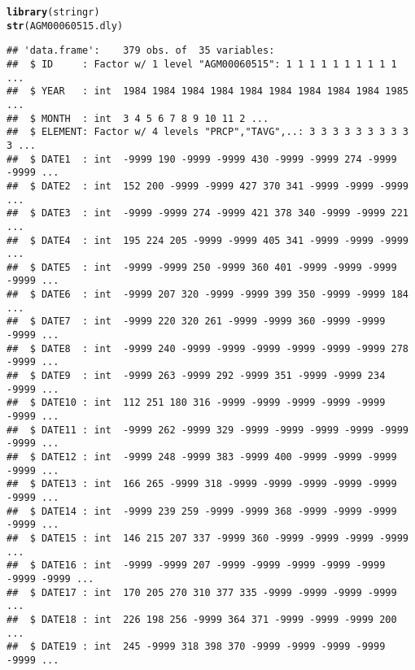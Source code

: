 \documentclass{article}\usepackage[]{graphicx}\usepackage[]{color}
\makeatletter
\newcommand{\hlstd}[1]{\textcolor[rgb]{0.345,0.345,0.345}{#1}}%
\newcommand{\hlkwd}[1]{\textcolor[rgb]{0.737,0.353,0.396}{\textbf{#1}}}%
\newenvironment{kframe}{%
 \def\at@end@of@kframe{}%
 \ifinner\ifhmode%
  \def\at@end@of@kframe{\end{minipage}}%
  \begin{minipage}{\columnwidth}%
 \fi\fi%
 \def\FrameCommand##1{\hskip\@totalleftmargin \hskip-\fboxsep
 \colorbox{shadecolor}{##1}\hskip-\fboxsep
     \hskip-\linewidth \hskip-\@totalleftmargin \hskip\columnwidth}%
 \MakeFramed {\advance\hsize-\width
   \@totalleftmargin\z@ \linewidth\hsize
   \@setminipage}}%
 {\par\unskip\endMakeFramed%
 \at@end@of@kframe}
\newenvironment{knitrout}{}{} %
\makeatother
\begin{document}
\begin{knitrout}
\begin{kframe}
{\ttfamily\noindent\itshape\color{messagecolor}{\#\# \\\#\# Attaching package: 'dplyr'\\\#\# \\\#\# The following objects are masked from 'package:stats':\\\#\# \\\#\#\ \ \ \  filter, lag\\\#\# \\\#\# The following objects are masked from 'package:base':\\\#\# \\\#\#\ \ \ \  intersect, setdiff, setequal, union}}\begin{alltt}
\hlkwd{library}\hlstd{(stringr)}
\hlkwd{str}\hlstd{(AGM00060515.dly)}
\end{alltt}
\begin{verbatim}
## 'data.frame':	379 obs. of  35 variables:
##  $ ID     : Factor w/ 1 level "AGM00060515": 1 1 1 1 1 1 1 1 1 1 ...
##  $ YEAR   : int  1984 1984 1984 1984 1984 1984 1984 1984 1984 1985 ...
##  $ MONTH  : int  3 4 5 6 7 8 9 10 11 2 ...
##  $ ELEMENT: Factor w/ 4 levels "PRCP","TAVG",..: 3 3 3 3 3 3 3 3 3 3 ...
##  $ DATE1  : int  -9999 190 -9999 -9999 430 -9999 -9999 274 -9999 -9999 ...
##  $ DATE2  : int  152 200 -9999 -9999 427 370 341 -9999 -9999 -9999 ...
##  $ DATE3  : int  -9999 -9999 274 -9999 421 378 340 -9999 -9999 221 ...
##  $ DATE4  : int  195 224 205 -9999 -9999 405 341 -9999 -9999 -9999 ...
##  $ DATE5  : int  -9999 -9999 250 -9999 360 401 -9999 -9999 -9999 -9999 ...
##  $ DATE6  : int  -9999 207 320 -9999 -9999 399 350 -9999 -9999 184 ...
##  $ DATE7  : int  -9999 220 320 261 -9999 -9999 360 -9999 -9999 -9999 ...
##  $ DATE8  : int  -9999 240 -9999 -9999 -9999 -9999 -9999 -9999 278 -9999 ...
##  $ DATE9  : int  -9999 263 -9999 292 -9999 351 -9999 -9999 234 -9999 ...
##  $ DATE10 : int  112 251 180 316 -9999 -9999 -9999 -9999 -9999 -9999 ...
##  $ DATE11 : int  -9999 262 -9999 329 -9999 -9999 -9999 -9999 -9999 -9999 ...
##  $ DATE12 : int  -9999 248 -9999 383 -9999 400 -9999 -9999 -9999 -9999 ...
##  $ DATE13 : int  166 265 -9999 318 -9999 -9999 -9999 -9999 -9999 -9999 ...
##  $ DATE14 : int  -9999 239 259 -9999 -9999 368 -9999 -9999 -9999 -9999 ...
##  $ DATE15 : int  146 215 207 337 -9999 360 -9999 -9999 -9999 -9999 ...
##  $ DATE16 : int  -9999 -9999 207 -9999 -9999 -9999 -9999 -9999 -9999 -9999 ...
##  $ DATE17 : int  170 205 270 310 377 335 -9999 -9999 -9999 -9999 ...
##  $ DATE18 : int  226 198 256 -9999 364 371 -9999 -9999 -9999 200 ...
##  $ DATE19 : int  245 -9999 318 398 370 -9999 -9999 -9999 -9999 -9999 ...

\end{verbatim}
\end{kframe}
\end{knitrout}
\end{document}
